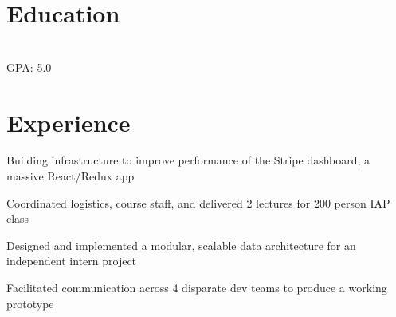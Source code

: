 \section{Education}
\raggedright

\hfill {}\\
GPA: 5.0\\
\sectionsep

\section{Experience}
\hfill {}
\begin{tightemize}
	\item Building infrastructure to improve performance of the Stripe dashboard, a massive React/Redux app
\end{tightemize}
\sectionsep

\hfill {}
\begin{tightemize}
    \item Coordinated logistics, course staff, and delivered 2 lectures for 200 person IAP class
\end{tightemize}
\sectionsep

\hfill {}
\begin{tightemize}
    \item Designed and implemented a modular, scalable data architecture for an independent intern project
    \item Facilitated communication across 4 disparate dev teams to produce a working prototype
\end{tightemize}
\sectionsep

